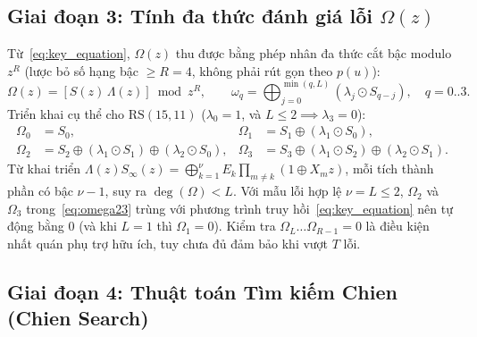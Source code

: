 \subsection{Giai đoạn 3: Tính đa thức đánh giá lỗi $\Omega(z)$}

Từ~\eqref{eq:key_equation}, $\Omega(z)$ thu được bằng phép nhân đa thức cắt bậc modulo $z^R$ (lược bỏ số hạng bậc $\ge R=4$, không phải rút gọn theo $p(u)$):
\begin{equation}
\Omega(z) = \left[ S(z)\,\Lambda(z) \right] \bmod z^R, \qquad \omega_q = \bigoplus_{j=0}^{\min(q, L)} \left(\lambda_j \odot S_{q-j}\right), \quad q = 0..3.
\label{eq:omega_def}
\end{equation}
Triển khai cụ thể cho $\text{RS}(15,11)$ ($\lambda_0 = 1$, và $L \le 2 \implies \lambda_3 = 0$):
\begin{align}
\Omega_0 &= S_0, &
\Omega_1 &= S_1 \oplus (\lambda_1 \odot S_0), \label{eq:omega01}\\
\Omega_2 &= S_2 \oplus (\lambda_1 \odot S_1) \oplus (\lambda_2 \odot S_0), &
\Omega_3 &= S_3 \oplus (\lambda_1 \odot S_2) \oplus (\lambda_2 \odot S_1). \label{eq:omega23}
\end{align}
Từ khai triển $\Lambda(z) S_\infty(z) = \bigoplus_{k=1}^{\nu} E_k \prod_{m \neq k}(1 \oplus X_m z)$, mỗi tích thành phần có bậc $\nu - 1$, suy ra $\deg(\Omega) < L$. Với mẫu lỗi hợp lệ $\nu = L \le 2$, $\Omega_2$ và $\Omega_3$ trong~\eqref{eq:omega23} trùng với phương trình truy hồi~\eqref{eq:key_equation} nên tự động bằng $0$ (và khi $L=1$ thì $\Omega_1 = 0$). Kiểm tra $\Omega_L \dots \Omega_{R-1} = 0$ là điều kiện nhất quán phụ trợ hữu ích, tuy chưa đủ đảm bảo khi vượt $T$ lỗi.

\subsection{Giai đoạn 4: Thuật toán Tìm kiếm Chien (Chien Search)}


